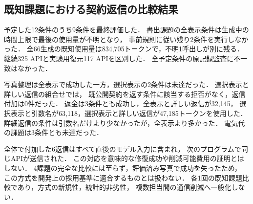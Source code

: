 \subsection{既知課題における契約返信の比較結果}
予定した12条件のうち9条件を最終評価した．
書出課題の全表示条件は生成中の時間上限で最後の使用量が不明となり，
事前規則に従い残り2条件を実行しなかった．
全66生成の既知使用量は834,705トークンで，不明1呼出しが別に残る．
継続325 APIと実験用復元117 APIを区別した．
全予定条件の原記録監査に不一致はなかった．

写真整理は全表示で成功した一方，選択表示の2条件は未達だった．
選択表示と詳しい返信の組合せでは，
既公開契約を返す条件に該当する拒否がなく，返信付加は0件だった．
返金は3条件とも成功し，全表示と詳しい返信が32,145，
選択表示と引数名が63,118，選択表示と詳しい返信が47,185トークンを使用した．
詳細返信の条件は引数名だけより少なかったが，全表示より多かった．
電気代の課題は3条件とも未達だった．

全体で付加した6返信はすべて直後のモデル入力に含まれ，
次のプログラムで同じAPIが送信された．
この対応を意味的な修復成功や削減可能費用の証明とはしない．
4課題の完全な比較には至らず，評価済み写真で成功を失ったため，
この方式を開発上の採用基準に適合するものとは扱わない．
各1回の既知課題比較であり，方式の新規性，統計的非劣性，
複数担当間の通信削減へ一般化しない．
